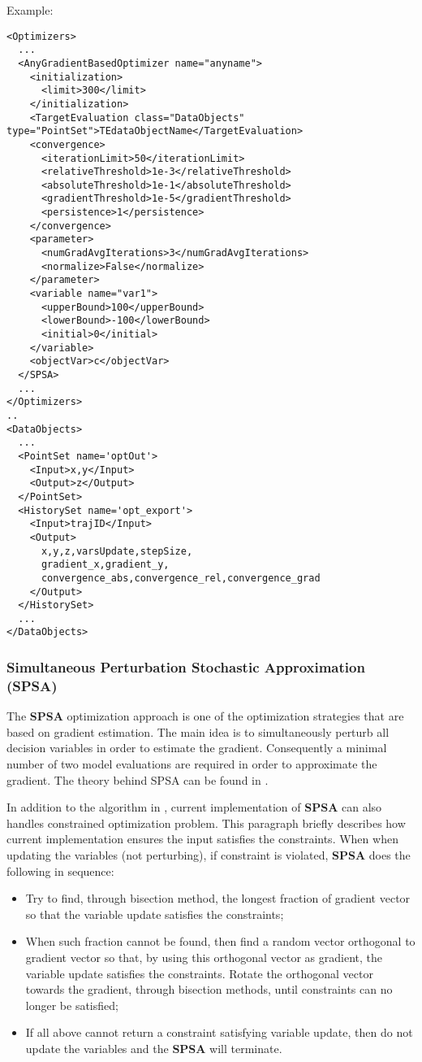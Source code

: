 Example:
\begin{lstlisting}[style=XML]
<Optimizers>
  ...
  <AnyGradientBasedOptimizer name="anyname">
    <initialization>
      <limit>300</limit>
    </initialization>
    <TargetEvaluation class="DataObjects" type="PointSet">TEdataObjectName</TargetEvaluation>
    <convergence>
      <iterationLimit>50</iterationLimit>
      <relativeThreshold>1e-3</relativeThreshold>
      <absoluteThreshold>1e-1</absoluteThreshold>
      <gradientThreshold>1e-5</gradientThreshold>
      <persistence>1</persistence>
    </convergence>
    <parameter>
      <numGradAvgIterations>3</numGradAvgIterations>
      <normalize>False</normalize>
    </parameter>
    <variable name="var1">
      <upperBound>100</upperBound>
      <lowerBound>-100</lowerBound>
      <initial>0</initial>
    </variable>
    <objectVar>c</objectVar>
  </SPSA>
  ...
</Optimizers>
..
<DataObjects>
  ...
  <PointSet name='optOut'>
    <Input>x,y</Input>
    <Output>z</Output>
  </PointSet>
  <HistorySet name='opt_export'>
    <Input>trajID</Input>
    <Output>
      x,y,z,varsUpdate,stepSize,
      gradient_x,gradient_y,
      convergence_abs,convergence_rel,convergence_grad
    </Output>
  </HistorySet>
  ...
</DataObjects>
\end{lstlisting}

\subsubsection{Simultaneous Perturbation Stochastic Approximation (SPSA)}
\label{subsubsubsec:SPSA}
The \textbf{SPSA} optimization approach is one of the optimization strategies that are based on gradient estimation. The main
idea is to simultaneously perturb all decision variables in order to estimate the gradient. Consequently a minimal number of two
model evaluations are required in order to approximate the gradient. The theory behind SPSA can be found in
\cite{spall1998implementation}.

In addition to the algorithm in \cite{spall1998implementation}, current implementation of \textbf{SPSA} can also handles
constrained optimization problem. This paragraph briefly describes how current implementation ensures the input satisfies the
constraints. When when updating the variables (not perturbing), if constraint is violated, \textbf{SPSA} does the following in
sequence:
\begin{itemize}
\item Try to find, through bisection method, the longest fraction of gradient vector so that the variable update satisfies the
constraints;
\item When such fraction cannot be found, then find a random vector orthogonal to gradient vector so that, by using this
orthogonal vector as gradient, the variable update satisfies the constraints. Rotate the orthogonal vector towards the gradient,
through bisection methods, until constraints can no longer be satisfied;
\item If all above cannot return a constraint satisfying variable update, then do not update the variables and the \textbf{SPSA} will
terminate.
\end{itemize}

